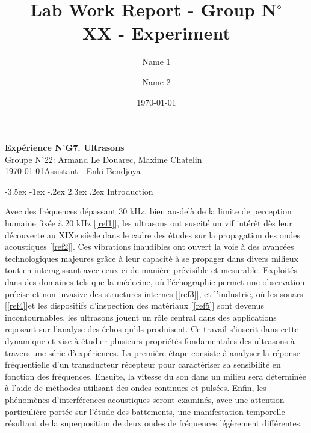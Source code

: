 \documentclass[a4paper, 12pt,oneside]{article}
\makeatletter
\renewcommand{\section}{\@startsection {section}{1}{\z@}%
             {-3.5ex \@plus -1ex \@minus -.2ex}%
             {2.3ex \@plus.2ex}%
             {\normalfont\normalsize\bfseries}}
\makeatother
\begin{document}
\title{\normalsize{Lab Work Report - Group N$^\circ$\\ XX - Experiment}}
\date{\normalsize{\today}}
\author{\normalsize{Name} 1\and \normalsize{Name 2}}

\begin{center}
\large\textbf{\sffamily Expérience N$^\circ$G7. Ultrasons}\\%
\large\sffamily Groupe N$^\circ$22: Armand Le Douarec, Maxime Chatelin\\%
\large\sffamily\today\quad   Assistant -  Enki Bendjoya \\%
\end{center}

\vspace{-0.25cm}
\section{Introduction}
\vspace{-0.25cm}

Avec des fréquences dépassant 30 kHz, bien au-delà de la limite de perception humaine fixée à 20 kHz [\ref{ref1}], les ultrasons ont suscité un vif intérêt dès leur découverte au XIXe siècle dans le cadre des études sur la propagation des ondes acoustiques [\ref{ref2}]. Ces vibrations inaudibles ont ouvert la voie à des avancées technologiques majeures grâce à leur capacité à se propager dans divers milieux tout en interagissant avec ceux-ci de manière prévisible et mesurable. Exploités dans des domaines tels que la médecine, où l’échographie permet une observation précise et non invasive des structures internes [\ref{ref3}], et l’industrie, où les sonars [\ref{ref4}]et les dispositifs d’inspection des matériaux [\ref{ref5}] sont devenus incontournables, les ultrasons jouent un rôle central dans des applications reposant sur l’analyse des échos qu’ils produisent. Ce travail s’inscrit dans cette dynamique et vise à étudier plusieurs propriétés fondamentales des ultrasons à travers une série d’expériences. La première étape consiste à analyser la réponse fréquentielle d’un transducteur récepteur pour caractériser sa sensibilité en fonction des fréquences. Ensuite, la vitesse du son dans un milieu sera déterminée à l’aide de méthodes utilisant des ondes continues et pulsées. Enfin, les phénomènes d’interférences acoustiques seront examinés, avec une attention particulière portée sur l’étude des battements, une manifestation temporelle résultant de la superposition de deux ondes de fréquences légèrement différentes.
\end{document}
